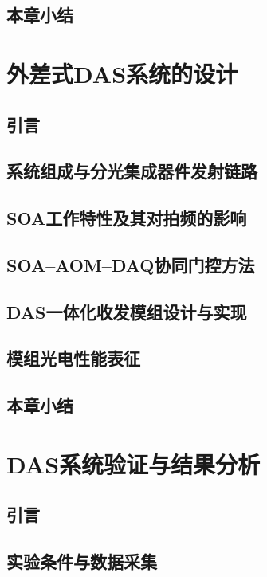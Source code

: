 \section{本章小结}

\chapter{外差式DAS系统的设计}
\thispagestyle{main}

\section{引言}
\section{系统组成与分光集成器件发射链路}%
\section{SOA工作特性及其对拍频的影响}
\section{SOA--AOM--DAQ协同门控方法}
\section{DAS一体化收发模组设计与实现}
\section{模组光电性能表征}
\section{本章小结}

\chapter{DAS系统验证与结果分析}
\thispagestyle{main}

\section{引言}
\section{实验条件与数据采集}
